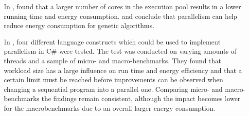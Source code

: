 
In \cite{abdelhafez2019}, found that a larger number of cores in the execution pool results in a lower running time and energy consumption, and conclude that parallelism can help reduce energy consumption for genetic algorithms. %

In \cite{Lindholt2022}, %
four different language constructs which could be used to implement parallelism in C\# were tested. The test was conducted on varying amounts of threads and a sample of micro- and macro-benchmarks. They found that workload size has a large influence on run time and energy efficiency and that a certain limit must be reached before improvements can be observed when changing a sequential program into a parallel one. Comparing micro- and macro-benchmarks the findings remain consistent, although the impact becomes lower for the macrobenchmarks due to an overall larger energy consumption.%



